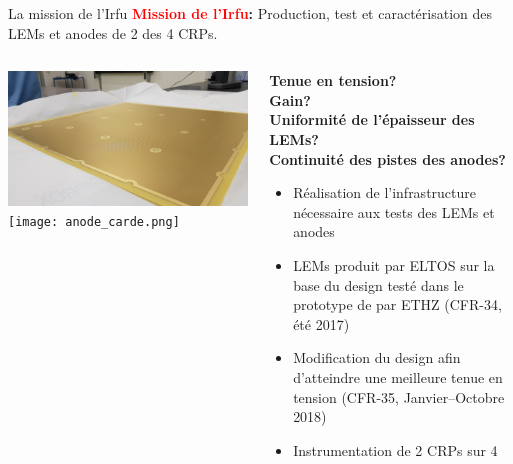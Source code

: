     \begin{frame}{La mission de l'Irfu}
        \centering \textbf{\textcolor{red}{Mission de l'Irfu}: }Production, test et caractérisation des LEMs et anodes de 2 des 4 CRPs.\\\vfill
    	\begin{scriptsize}
        	\begin{columns}
            	\begin{column}{0.5\textwidth}
                	\includegraphics[width=\textwidth]{./pictures/LEM.png}\\
                   	\texttt{[image: anode\_carde.png]}
            	\end{column}
       	        \begin{column}{0.5\textwidth}
           	        \textbf{Tenue en tension?\\
           	        Gain?\\
           	        Uniformité de l'épaisseur des LEMs?\\
           	        Continuité des pistes des anodes?\\}\vspace{0.3cm}
           	        \begin{itemize}
               	        \item Réalisation de l'infrastructure nécessaire aux tests des LEMs et anodes
               	        \item LEMs produit par ELTOS sur la base du design testé dans le prototype de \threeL{} par ETHZ (CFR-34, été 2017)
               	        \item Modification du design afin d'atteindre une meilleure tenue en tension (CFR-35, Janvier--Octobre 2018)
               	        \item Instrumentation de 2 CRPs sur 4
           	        \end{itemize}
       	        \end{column}
        	\end{columns}
   		\end{scriptsize}
    \end{frame}


